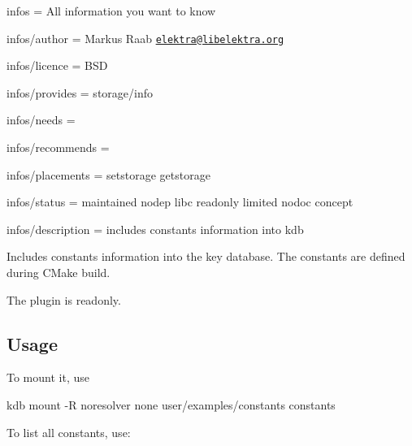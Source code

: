 
\begin{DoxyItemize}
\item infos = All information you want to know
\item infos/author = Markus Raab \href{mailto:elektra@libelektra.org}{\tt elektra@libelektra.\+org}
\item infos/licence = B\+SD
\item infos/provides = storage/info
\item infos/needs =
\item infos/recommends =
\item infos/placements = setstorage getstorage
\item infos/status = maintained nodep libc readonly limited nodoc concept
\item infos/description = includes constants information into kdb
\end{DoxyItemize}

Includes constants information into the key database. The constants are defined during C\+Make build.

The plugin is readonly.

\subsection*{Usage}

To mount it, use


\begin{DoxyCode}
kdb mount -R noresolver none user/examples/constants constants
\end{DoxyCode}


To list all constants, use\+:


